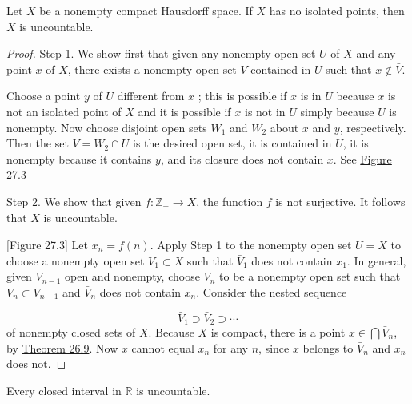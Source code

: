 \begin{theorem}
\label{thm:\thetheorem}
 Let \(X\) be a nonempty compact Hausdorff space. If \(X\) has no isolated points, then \(X\) is uncountable.

\end{theorem}
\begin{proof}
Step 1. We show first that given any nonempty open set \(U\) of \(X\) and any point \(x\) of \(X\), there exists a nonempty open set \(V\) contained in \(U\) such that \(x \notin \bar{V}\).

Choose a point \(y\) of \(U\) different from \(x\) ; this is possible if \(x\) is in \(U\) because \(x\) is not an isolated point of \(X\) and it is possible if \(x\) is not in \(U\) simply because \(U\) is nonempty. Now choose disjoint open sets \(W_{1}\) and \(W_{2}\) about \(x\) and \(y\), respectively. Then the set \(V = W_{2} \cap U\) is the desired open set, it is contained in \(U\), it is nonempty because it contains \(y\), and its closure does not contain \(x\). See \hyperref[fig:27.3]{Figure 27.3}

Step 2. We show that given \(f : \mathbb{Z}_{ + } \rightarrow X\), the function \(f\) is not surjective. It follows that \(X\) is uncountable.

[Figure 27.3]
Let \(x_{n} = f(n)\). Apply Step 1 to the nonempty open set \(U = X\) to choose a nonempty open set \(V_{1} \subset X\) such that \(\bar{V}_{1}\) does not contain \(x_{1}\). In general, given \(V_{n - 1}\) open and nonempty, choose \(V_{n}\) to be a nonempty open set such that \(V_{n} \subset {V}_{n - 1}\) and \(\bar{V}_{n}\) does not contain \(x_{n}\). Consider the nested sequence

\[
\bar{V}_{1} \supset {\bar{V}}_{2} \supset \cdots
\]
of nonempty closed sets of \(X\). Because \(X\) is compact, there is a point \(x \in \bigcap {\bar{V}}_{n}\), by \hyperref[thm:26.9]{Theorem 26.9}. Now \(x\) cannot equal \(x_{n}\) for any \(n\), since \(x\) belongs to \(\bar{V}_{n}\) and \(x_{n}\) does not.
\end{proof}

\begin{corollary}
\label{cor:\thetheorem}
 Every closed interval in \(\mathbb{R}\) is uncountable.
\end{corollary}

